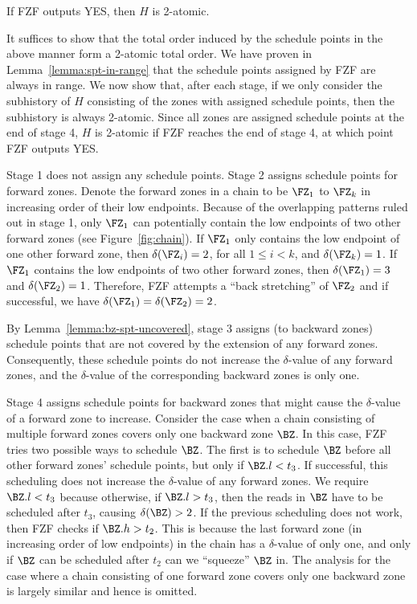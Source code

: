 {\begin{lemma}
  \label{lemma:fzf-yes-implies-h-2-atomic}
  If FZF outputs YES, then $H$ is 2-atomic.
\end{lemma}

\proof It suffices to show that the total order induced by the
schedule points in the above manner form a 2-atomic total order.  We
have proven in Lemma~\ref{lemma:spt-in-range} that the schedule points
assigned by FZF are always in range.  We now show that, after each
stage, if we only consider the subhistory of $H$ consisting of the
zones with assigned schedule points, then the subhistory is always
2-atomic.  Since all zones are assigned schedule points at the end of
stage 4, $H$ is 2-atomic if FZF reaches the end of stage 4, at which
point FZF outputs YES.

Stage 1 does not assign any schedule points.  Stage 2 assigns schedule
points for forward zones.  Denote the forward zones in a chain to be
$\FZ_1$ to $\FZ_k$ in increasing order of their low endpoints.
Because of the overlapping patterns ruled out in stage 1, only $\FZ_1$
can potentially contain the low endpoints of two other forward zones
(see Figure~\ref{fig:chain}).  If $\FZ_1$ only contains the low endpoint
of one other forward zone, then $\delta(\FZ_i) = 2$, for all $1 \leq i
< k$, and $\delta(\FZ_k) = 1$.  If $\FZ_1$ contains the low endpoints
of two other forward zones, then $\delta(\FZ_1)=3$ and
$\delta(\FZ_2)=1$.  Therefore, FZF attempts a ``back stretching'' of
$\FZ_2$ and if successful, we have $\delta(\FZ_1) = \delta(\FZ_2) =
2$.

By Lemma~\ref{lemma:bz-spt-uncovered}, stage 3 assigns (to backward zones)
schedule points that are not covered by the extension of any forward zones.
Consequently, these schedule points do not increase the $\delta$-value
of any forward zones, and the $\delta$-value of the corresponding backward zones is only one.

Stage 4 assigns schedule points for backward zones that might cause
the $\delta$-value of a forward zone to increase.  Consider the case
when a chain consisting of multiple forward zones covers only one
backward zone $\BZ$.  In this case, FZF tries two possible ways to
schedule $\BZ$.  The first is to schedule $\BZ$ before all other
forward zones' schedule points, but only if $\BZ.l < t_3$.  If
successful, this scheduling does not increase the $\delta$-value of
any forward zones.  We require $\BZ.l < t_3$ because otherwise, if
$\BZ.l > t_3$, then the reads in $\BZ$ have to be scheduled after
$t_3$, causing $\delta(\BZ) > 2$.  If the previous scheduling does not
work, then FZF checks if $\BZ.h > t_2$.  This is because the last
forward zone (in increasing order of low endpoints) in the chain has a
$\delta$-value of only one, and only if $\BZ$ can be scheduled after
$t_2$ can we ``squeeze'' $\BZ$ in.  The analysis for the case where a
chain consisting of one forward zone covers only one backward zone is
largely similar and hence is omitted.

}
